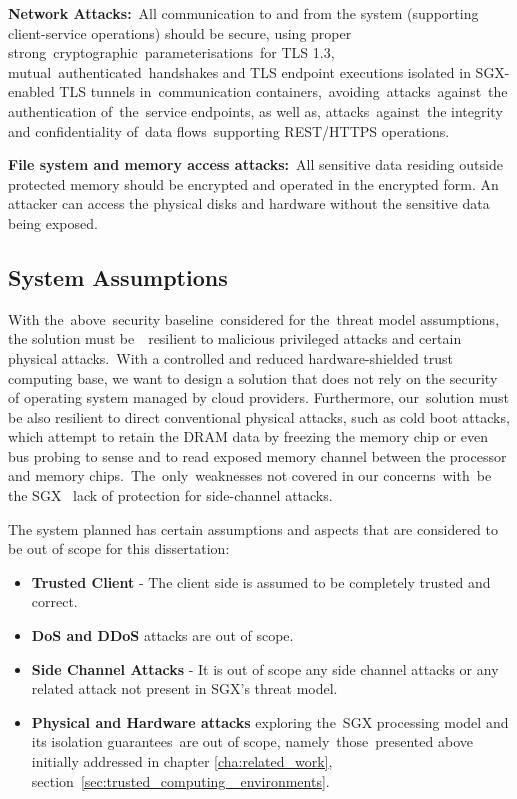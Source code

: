\textbf{Network Attacks:} All communication to and from the system (supporting client-service operations) should be secure, using proper strong cryptographic parameterisations for \gls{TLS} 1.3, mutual authenticated handshakes and TLS endpoint executions isolated in SGX-enabled \gls{TLS} tunnels in communication containers, avoiding attacks against the authentication of the service endpoints, as well as, attacks against the integrity and confidentiality of data flows supporting \gls{REST}/\gls{HTTPS} operations.

\textbf{File system and memory access attacks:} All sensitive data residing outside protected memory should be encrypted and operated in the encrypted form. An attacker can access the physical disks and hardware without the sensitive data being exposed.
	
\subsection{System Assumptions}
\label{ssec:other_system_assumptions}

With the above security baseline considered for the threat model assumptions, the solution must be  resilient to malicious privileged attacks and certain physical attacks. With a controlled and reduced hardware-shielded trust computing base, we want to design a solution that does not rely on the security of operating system managed by cloud providers. Furthermore, our solution must be also resilient to direct conventional physical attacks, such as cold boot attacks, which attempt to retain the DRAM data by freezing the memory chip or even bus probing to sense and to read exposed memory channel between the processor and memory chips. The only weaknesses not covered in our concerns with be the SGX  lack of protection for side-channel attacks.

The system planned has certain assumptions and aspects that are considered to be out of scope for this dissertation:

\begin{itemize}
	\item \textbf{Trusted Client} - The client side is assumed to be completely trusted and correct.
	\item \textbf{\gls{DoS} and \gls{DDoS}} attacks are out of scope.
	\item \textbf{Side Channel Attacks} - It is out of scope any side channel attacks or any related attack not present in \gls{SGX}'s threat model.
	\item \textbf{Physical and Hardware attacks} exploring the \gls{SGX} processing model and its isolation guarantees are out of scope, namely those presented above initially addressed in chapter \ref{cha:related_work}, section \ref{sec:trusted_computing _environments}.
\end{itemize}

